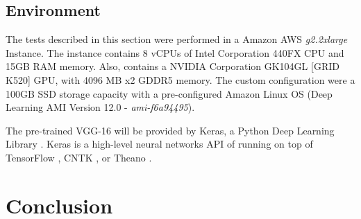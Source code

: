 \documentclass[10pt,twocolumn,letterpaper]{article}
\begin{document}

\subsection{Environment} \label{ssec:environment}

The tests described in this section were performed in a Amazon AWS \cite{AMAZON_WEBSITE} \textit{g2.2xlarge} Instance. The instance contains 8 vCPUs of Intel Corporation 440FX CPU and 15GB RAM memory. Also, contains a NVIDIA Corporation GK104GL [GRID K520] GPU, with 4096 MB x2 GDDR5 memory. The custom configuration were a 100GB SSD storage capacity with a pre-configured Amazon Linux OS (Deep Learning AMI Version 12.0 - \textit{ami-f6a94495}).


The pre-trained VGG-16 will be provided by Keras, a Python Deep Learning Library \cite{KERAS}. Keras is a high-level neural networks API of running on top of TensorFlow \cite{TENSORFLOW}, CNTK \cite{CNTK}, or Theano \cite{THEANO} \cite{KERAS}.

\section{Conclusion} \label{sec:conclusion}



{\small


}
\end{document}
